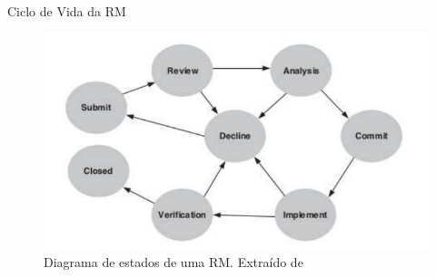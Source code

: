 \documentclass[t,14pt,mathserif]{beamer}
\begin{document}
\begin{frame}{Ciclo de Vida da RM}

    \begin{figure}[htpb]
        \centering
        \includegraphics[width=0.55\linewidth]{../img/diagrama-estado-rm.pdf}
        \caption{Diagrama de estados de uma RM\@. Extraído
            de~\cite{tripathy2014software}}
\label{fig:diagrama-estado-rm}
    \end{figure}

\end{frame}
\end{document}
